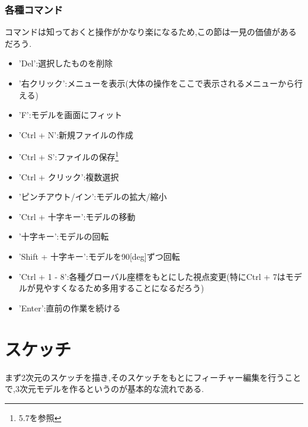 \documentclass[a4paper,11pt]{jsarticle}
\begin{document}
\subsubsection{各種コマンド}
コマンドは知っておくと操作がかなり楽になるため,この節は一見の価値があるだろう.
\begin{itemize}
 \item 'Del':選択したものを削除
 \item '右クリック':メニューを表示(大体の操作をここで表示されるメニューから行える)
 \item 'F':モデルを画面にフィット
 \item 'Ctrl + N':新規ファイルの作成
 \item 'Ctrl + S':ファイルの保存\footnote{5.7を参照}
 \item 'Ctrl + クリック':複数選択
 \item 'ピンチアウト/イン':モデルの拡大/縮小
 \item 'Ctrl + 十字キー':モデルの移動
 \item '十字キー':モデルの回転
 \item 'Shift + 十字キー':モデルを90[deg]ずつ回転
 \item 'Ctrl + 1 - 8':各種グローバル座標をもとにした視点変更(特にCtrl + 7はモデルが見やすくなるため多用することになるだろう)
 \item 'Enter':直前の作業を続ける
\end{itemize}
\section{スケッチ}
まず2次元のスケッチを描き,そのスケッチをもとにフィーチャー編集を行うことで,3次元モデルを作るというのが基本的な流れである.
\end{document}

